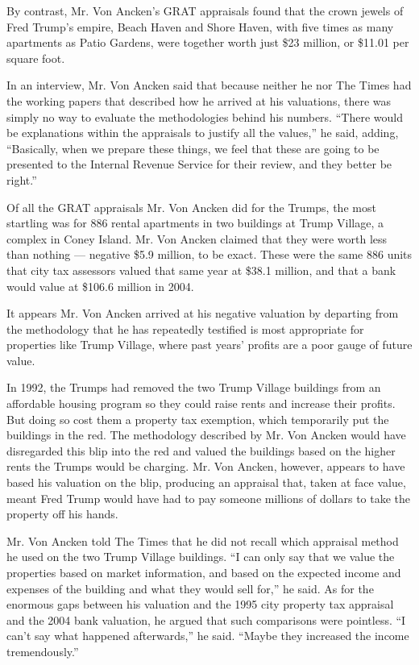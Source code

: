 By contrast, Mr. Von Ancken's GRAT appraisals found that the crown
jewels of Fred Trump's empire, Beach Haven and Shore Haven, with five
times as many apartments as Patio Gardens, were together worth just \$23
million, or \$11.01 per square foot.

In an interview, Mr. Von Ancken said that because neither he nor The
Times had the working papers that described how he arrived at his
valuations, there was simply no way to evaluate the methodologies behind
his numbers. ``There would be explanations within the appraisals to
justify all the values,'' he said, adding, ``Basically, when we prepare
these things, we feel that these are going to be presented to the
Internal Revenue Service for their review, and they better be right.''

Of all the GRAT appraisals Mr. Von Ancken did for the Trumps, the most
startling was for 886 rental apartments in two buildings at Trump
Village, a complex in Coney Island. Mr. Von Ancken claimed that they
were worth less than nothing --- negative \$5.9 million, to be exact.
These were the same 886 units that city tax assessors valued that same
year at \$38.1 million, and that a bank would value at \$106.6 million
in 2004.

It appears Mr. Von Ancken arrived at his negative valuation by departing
from the methodology that he has repeatedly testified is most
appropriate for properties like Trump Village, where past years' profits
are a poor gauge of future value.

In 1992, the Trumps had removed the two Trump Village buildings from an
affordable housing program so they could raise rents and increase their
profits. But doing so cost them a property tax exemption, which
temporarily put the buildings in the red. The methodology described by
Mr. Von Ancken would have disregarded this blip into the red and valued
the buildings based on the higher rents the Trumps would be charging.
Mr. Von Ancken, however, appears to have based his valuation on the
blip, producing an appraisal that, taken at face value, meant Fred Trump
would have had to pay someone millions of dollars to take the property
off his hands.

Mr. Von Ancken told The Times that he did not recall which appraisal
method he used on the two Trump Village buildings. ``I can only say that
we value the properties based on market information, and based on the
expected income and expenses of the building and what they would sell
for,'' he said. As for the enormous gaps between his valuation and the
1995 city property tax appraisal and the 2004 bank valuation, he argued
that such comparisons were pointless. ``I can't say what happened
afterwards,'' he said. ``Maybe they increased the income tremendously.''

